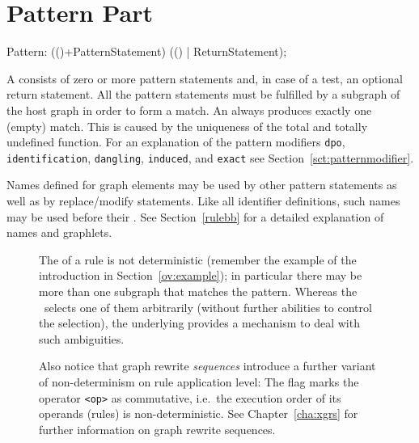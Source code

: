 \section{Pattern Part}
\label{patternpart}
\begin{rail}
  Pattern: (()+PatternStatement) (() | ReturnStatement);
\end{rail}
A  consists of zero or more pattern statements and, in case of a test, an optional return statement.
All the pattern statements must be fulfilled by a subgraph of the host graph in order to form a match. 
An  always produces exactly one (empty) match. 
This is caused by the uniqueness of the total and totally undefined function.
For an explanation of the pattern modifiers \texttt{dpo}, \texttt{identification}, \texttt{dangling}, \texttt{induced}, and \texttt{exact} see Section~\ref{sct:patternmodifier}.

Names defined for graph elements may be used by other pattern statements as well as by replace/modify statements. 
Like all identifier definitions, such names may be used before their . 
See Section~\ref{rulebb} for a detailed explanation of names and graphlets.
\begin{figure}[htbp]
\begin{note}
\label{note:indeterminism}
The  of a rule is not deterministic (remember the example of the introduction in Section~\ref{ov:example}); in particular there may be more than one subgraph that matches the pattern. 
Whereas the \GrShell\ selects one of them arbitrarily (without further abilities to control the selection), the underlying \LibGr{} provides a mechanism to deal with such ambiguities. 

Also notice that graph rewrite \emph{sequences} introduce a further variant of non-determinism on rule application level: 
The  flag marks the operator \texttt{<op>} as commutative, i.e.\ the execution order of its operands (rules) is non-deterministic. 
See Chapter~\ref{cha:xgrs} for further information on graph rewrite sequences.
\end{note}
\end{figure}

